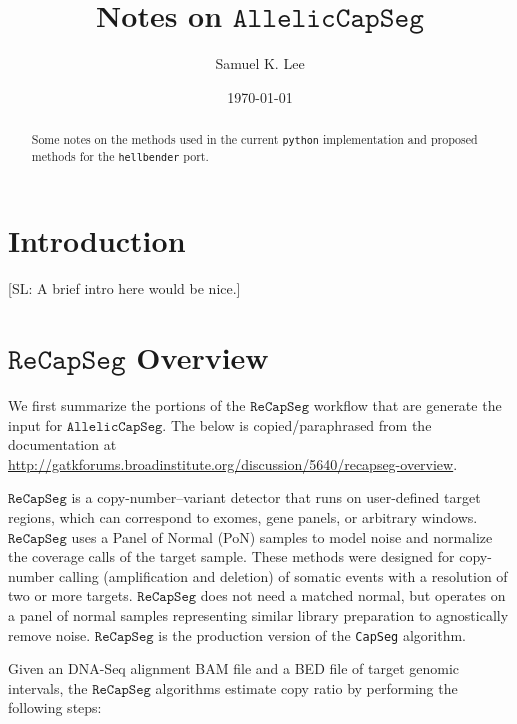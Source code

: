 \documentclass[nofootinbib,amssymb,amsmath]{revtex4}
\newcommand{\RCS}{\texttt{ReCapSeg}}
\newcommand{\ACS}{\texttt{AllelicCapSeg}}
\def\SL#1{{\color [rgb]{0,0,0.8} [SL: #1]}}
\begin{document}
\title{Notes on $\ACS$}
\author{Samuel K. Lee}
\date{\today}

\begin{abstract}
Some notes on the methods used in the current \texttt{python} implementation and proposed methods for the \texttt{hellbender}
port.
\end{abstract}

\maketitle



\section{Introduction}\label{introduction}

\SL{A brief intro here would be nice.}

\section{$\RCS$ Overview} \label{recapseg-overview}

We first summarize the portions of the $\RCS$ workflow that are generate the input for $\ACS$.  The below is copied/paraphrased from the documentation at \url{http://gatkforums.broadinstitute.org/discussion/5640/recapseg-overview}.

$\RCS$ is a copy-number--variant detector that runs on user-defined target regions, which can correspond to exomes, gene panels, or arbitrary windows. $\RCS$ uses a Panel of Normal (PoN) samples to model noise and normalize the coverage calls of the target sample. These methods were designed for copy-number calling (amplification and deletion) of somatic events with a resolution of two or more targets. $\RCS$ does not need a matched normal, but operates on a panel of normal samples representing similar library preparation to agnostically remove noise. $\RCS$ is the production version of the \texttt{CapSeg} algorithm.

Given an DNA-Seq alignment BAM file and a BED file of target genomic intervals, the $\RCS$ algorithms estimate copy ratio by performing the following steps:
\end{document}
